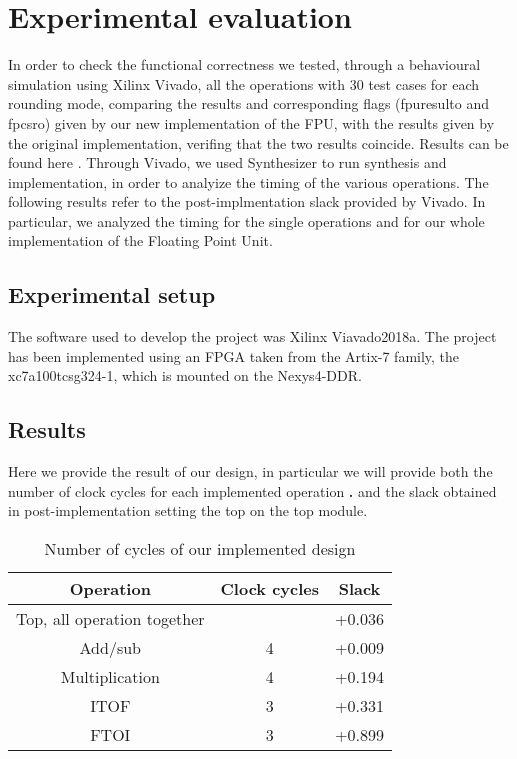 \section{Experimental evaluation}
In order to check the functional correctness we tested, through a behavioural simulation using Xilinx Vivado, all the operations with 30 test cases for each rounding mode, comparing the results and corresponding flags (fpu\textunderscore result\textunderscore o and fpcsr\textunderscore o) given by our new implementation of the FPU, with the results given by the original implementation, verifing that the two results coincide. Results can be found here \cite{mor1kxtest}.
Through Vivado, we used Synthesizer to run synthesis and implementation, in order to analyize the timing of the various operations. The following results refer to the post-implmentation slack provided by Vivado. In particular, we analyzed the timing for the single operations and for our whole implementation of the Floating Point Unit.

\subsection{Experimental setup}
The software used to develop the project was Xilinx Viavado2018a.
The project has been implemented using an FPGA taken from the Artix-7 family, the xc7a100tcsg324-1, which is mounted on the Nexys4-DDR.

\subsection{Results}
Here we provide the result of our design, in particular we will provide both the number of clock cycles for each implemented operation \textbf{.} and the slack obtained in post-implementation setting the top on the top module.


\begin{table}
\small
\begin{center}
\caption{Number of cycles of our implemented design}

\begin{tabular}{@{}|c|c|c|@{}}
\toprule
\textbf{Operation}& \textbf{Clock cycles} & \textbf{Slack } \\ \midrule
Top, all operation together &              & +0.036 \\ \midrule
Add/sub                     & 4            & +0.009 \\ \midrule
Multiplication              & 4            & +0.194 \\ \midrule
ITOF                        & 3            & +0.331 \\ \midrule
FTOI                        & 3            & +0.899 \\ \bottomrule
\end{tabular}
  \label{tab:clockCycles}
\end{center}
\end{table}

